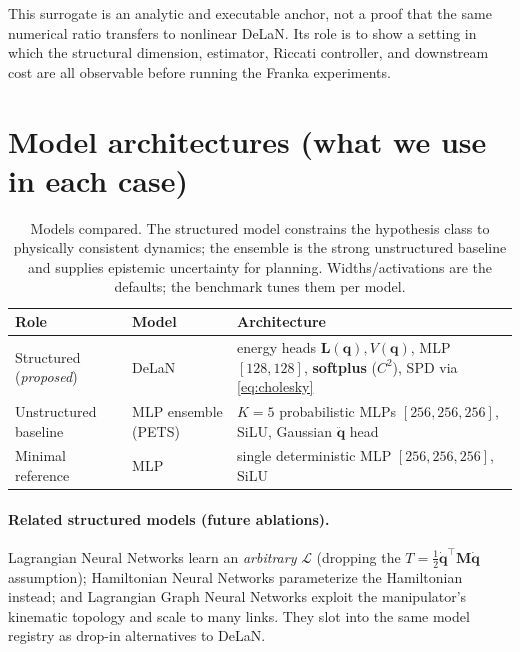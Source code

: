 \documentclass[11pt]{article}
\newcommand{\q}{\bm{q}}
\newcommand{\qd}{\dot{\bm{q}}}
\newcommand{\qdd}{\ddot{\bm{q}}}
\newcommand{\M}{\bm{M}}
\newcommand{\Lo}{\bm{L}}
\begin{document}
\begin{table}[h]
\centering

\caption{Seed-averaged relative LQR cost gap on the true system. ``Free'' is
unrestricted $(A,B)$ least squares; ``mech.'' is constrained mechanical least
squares. The table is regenerated by \texttt{scripts/run\_lqr\_surrogate.py}.}
\label{tab:lqr-surrogate}
\end{table}

This surrogate is an analytic and executable anchor, not a proof that the same
numerical ratio transfers to nonlinear DeLaN. Its role is to show a setting in
which the structural dimension, estimator, Riccati controller, and downstream
cost are all observable before running the Franka experiments.

\section{Model architectures (what we use in each case)}
\label{sec:arch}
\begin{table}[h]
\centering
\begin{tabularx}{\textwidth}{@{}p{}p{}X@{}}
\toprule
Role & Model & Architecture \\
\midrule
Structured (\emph{proposed}) & DeLaN \cite{lutter2019delan} &
  energy heads $\Lo(\q),V(\q)$, MLP $[128,128]$, \textbf{softplus} ($C^2$),
  SPD via \eqref{eq:cholesky} \\
Unstructured baseline & MLP ensemble (PETS) \cite{chua2018pets} &
  $K{=}5$ probabilistic MLPs $[256,256,256]$, SiLU, Gaussian $\qdd$ head \\
Minimal reference & MLP & single deterministic MLP $[256,256,256]$, SiLU \\
\bottomrule
\end{tabularx}
\caption{Models compared. The structured model constrains the hypothesis class
to physically consistent dynamics; the ensemble is the strong unstructured
baseline and supplies epistemic uncertainty for planning. Widths/activations are
the defaults; the benchmark tunes them per model.}
\end{table}

\paragraph{Related structured models (future ablations).}
Lagrangian Neural Networks \cite{cranmer2020lnn} learn an \emph{arbitrary}
$\mathcal{L}$ (dropping the $T=\tfrac12\qd^\top\M\qd$ assumption); Hamiltonian
Neural Networks \cite{greydanus2019hnn} parameterize the Hamiltonian instead;
and Lagrangian Graph Neural Networks \cite{bhattoo2022lgnn} exploit the
manipulator's kinematic topology and scale to many links. They slot into the
same model registry as drop-in alternatives to DeLaN.
\end{document}
